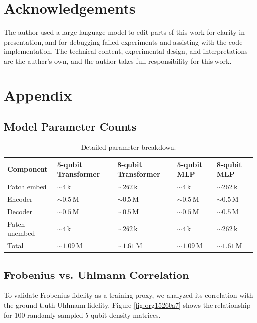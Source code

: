 \documentclass[11pt]{article}
\begin{document}
\section{Acknowledgements}
\label{sec:org98a2d99}
The author used a large language model to edit parts of this work for clarity in presentation, and for debugging failed experiments and assisting with the code implementation. The technical content, experimental design, and interpretations are the author's own, and the author takes full responsibility for this work.
\section{Appendix}
\label{sec:org00a79c6}

\subsection{Model Parameter Counts}
\label{sec:orgb0da3a9}
\begin{table}[htbp]
\caption{\label{tab:orgbce332d}Detailed parameter breakdown.}
\centering
\begin{tabular}{lllll}
Component & 5-qubit Transformer & 8-qubit Transformer & 5-qubit MLP & 8-qubit MLP\\[0pt]
\hline
Patch embed & \(\sim 4\,\mathrm{k}\) & \(\sim 262\,\mathrm{k}\) & \(\sim 4\,\mathrm{k}\) & \(\sim 262\,\mathrm{k}\)\\[0pt]
Encoder & \(\sim 0.5\,\mathrm{M}\) & \(\sim 0.5\,\mathrm{M}\) & \(\sim 0.5\,\mathrm{M}\) & \(\sim 0.5\,\mathrm{M}\)\\[0pt]
Decoder & \(\sim 0.5\,\mathrm{M}\) & \(\sim 0.5\,\mathrm{M}\) & \(\sim 0.5\,\mathrm{M}\) & \(\sim 0.5\,\mathrm{M}\)\\[0pt]
Patch unembed & \(\sim 4\,\mathrm{k}\) & \(\sim 262\,\mathrm{k}\) & \(\sim 4\,\mathrm{k}\) & \(\sim 262\,\mathrm{k}\)\\[0pt]
Total & \(\sim 1.09\,\mathrm{M}\) & \(\sim 1.61\,\mathrm{M}\) & \(\sim 1.09\,\mathrm{M}\) & \(\sim 1.61\,\mathrm{M}\)\\[0pt]
\end{tabular}
\end{table}

\subsection{Frobenius vs. Uhlmann Correlation}
\label{sec:org4af30cf}
To validate Frobenius fidelity as a training proxy, we analyzed its correlation with the ground-truth Uhlmann fidelity. Figure \ref{fig:org15260a7} shows the relationship for 100 randomly sampled 5-qubit density matrices.
\end{document}
